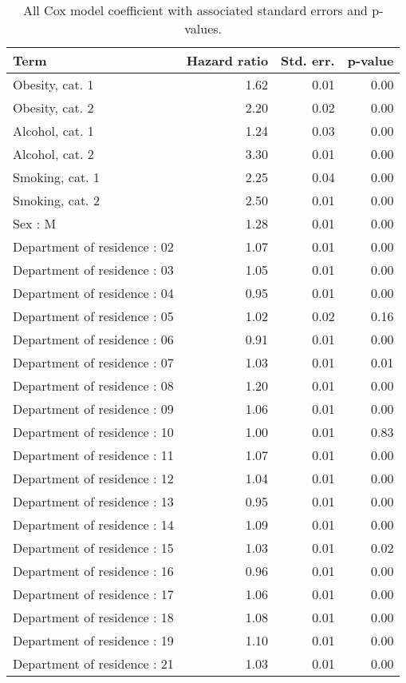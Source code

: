 \documentclass{article}
\begin{document}
\begin{longtable}{lrrr}
\caption{
\label{tab:all_cox_coefs}All Cox model coefficient with associated standard errors and p-values.
} \\ 
\toprule
Term & Hazard ratio & Std. err. & p-value \\ 
\midrule
Obesity, cat. 1 & 1.62 & 0.01 & 0.00 \\ 
Obesity, cat. 2 & 2.20 & 0.02 & 0.00 \\ 
Alcohol, cat. 1 & 1.24 & 0.03 & 0.00 \\ 
Alcohol, cat. 2 & 3.30 & 0.01 & 0.00 \\ 
Smoking, cat. 1 & 2.25 & 0.04 & 0.00 \\ 
Smoking, cat. 2 & 2.50 & 0.01 & 0.00 \\ 
Sex : M & 1.28 & 0.01 & 0.00 \\ 
Department of residence : 02 & 1.07 & 0.01 & 0.00 \\ 
Department of residence : 03 & 1.05 & 0.01 & 0.00 \\ 
Department of residence : 04 & 0.95 & 0.01 & 0.00 \\ 
Department of residence : 05 & 1.02 & 0.02 & 0.16 \\ 
Department of residence : 06 & 0.91 & 0.01 & 0.00 \\ 
Department of residence : 07 & 1.03 & 0.01 & 0.01 \\ 
Department of residence : 08 & 1.20 & 0.01 & 0.00 \\ 
Department of residence : 09 & 1.06 & 0.01 & 0.00 \\ 
Department of residence : 10 & 1.00 & 0.01 & 0.83 \\ 
Department of residence : 11 & 1.07 & 0.01 & 0.00 \\ 
Department of residence : 12 & 1.04 & 0.01 & 0.00 \\ 
Department of residence : 13 & 0.95 & 0.01 & 0.00 \\ 
Department of residence : 14 & 1.09 & 0.01 & 0.00 \\ 
Department of residence : 15 & 1.03 & 0.01 & 0.02 \\ 
Department of residence : 16 & 0.96 & 0.01 & 0.00 \\ 
Department of residence : 17 & 1.06 & 0.01 & 0.00 \\ 
Department of residence : 18 & 1.08 & 0.01 & 0.00 \\ 
Department of residence : 19 & 1.10 & 0.01 & 0.00 \\ 
Department of residence : 21 & 1.03 & 0.01 & 0.00 \\ 

\end{longtable}
\end{document}

